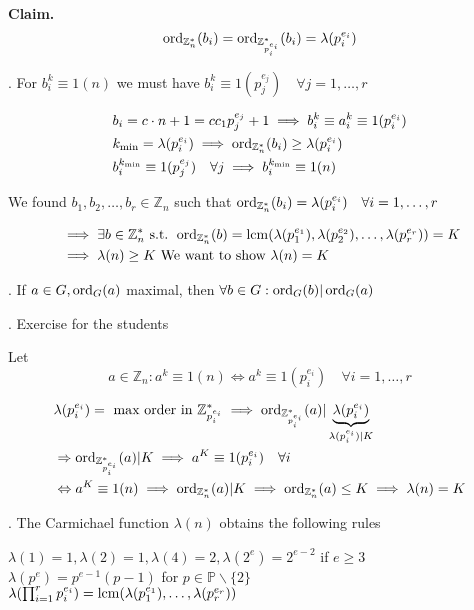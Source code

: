 \textbf{Claim.}
\[
  \operatorname{ord}_{\mathbb{Z}_n^{*}}(b_i) = \operatorname{ord}_{\mathbb{Z}_{p_i^{e_i}}^{*}} (b_i) = \lambda(p_i^{e_i})
\]

\Proof.
For $b_i^k \equiv 1 (n)$ we must have $b_i^k \equiv 1 (p_j^{e_j}) \quad \forall j = 1, \ldots, r$

\begin{align*}
  &b_i = c\cdot n+1 = c c_1 p_j^{e_j} +1 \implies b_i^k \equiv a_i^k \equiv 1 (p_i ^{e_i}) \\
  &k_{\min} = \lambda(p_i^{e_i}) \implies \operatorname{ord}_{\mathbb{Z}_n^{*}}(b_i) \geq \lambda(p_i^{e_i}) \\
  &b_i^{k_{\min}} \equiv 1 (p_j^{e_j}) \quad \forall j \implies b_i^{k_{\min}} \equiv 1 (n)
\end{align*}

We found $b_1, b_2, \ldots, b_r \in \mathbb{Z}_n$ such that $\operatorname{ord}_{\mathbb{Z}_n^{*}}(b_i) = \lambda(p_i^{e_i}) \quad \forall i = 1, \ldots, r$

\begin{align*}
  &\implies \exists b \in \mathbb{Z}_n^{*} \text{ s.t. } \operatorname{ord}_{\mathbb{Z}_n^{*}}(b) = \operatorname{lcm}(\lambda(p_1^{e_1}), \lambda(p_2^{e_2}), \ldots, \lambda(p_r^{e_r})) = K \\
  &\implies \lambda(n) \geq K \text{ We want to show $\lambda(n) = K$}
\end{align*}

\Theorem.
If $ a\in G, \operatorname{ord}_G(a)$ maximal, then $\forall b \in G: \operatorname{ord}_G(b) | \operatorname{ord}_G(a)$

\Proof. 
Exercise for the students

Let 
\[
  a\in \mathbb{Z}_n: a^k \equiv 1 (n) \Leftrightarrow a^k \equiv 1 (p_i^{e_i}) \quad \forall i = 1,\ldots, r
\]

\begin{align*}
  &\lambda(p_i^{e_i}) = \text{ max order in } \mathbb{Z}_{p_i^{e_i}}^{*} \implies \operatorname{ord}_{\mathbb{Z}_{p_i^{e_i}}^{*}}(a) | \underbrace{\lambda(p_i^{e_i})}_{\lambda(p_i^{e_i}) | K}\\
  &\Rightarrow \operatorname{ord}_{\mathbb{Z}_{p_i^{e_i}}^{*}}(a) | K \implies a^K \equiv 1 (p_i^{e_i}) \quad \forall i \\
  &\Leftrightarrow a^K \equiv 1 (n) \implies \operatorname{ord}_{\mathbb{Z}_{n}^{*}}(a) | K \implies  \operatorname{ord}_{\mathbb{Z}_n^{*}}(a) \leq K \implies \lambda(n) = K
\end{align*}

\Theorem.
The Carmichael function $\lambda(n)$ obtains the following rules

$\lambda(1) = 1, \lambda(2) = 1, \lambda(4) = 2, \lambda(2^e) = 2^{e-2} $ if $e \geq 3$\\
$\lambda(p^e) = p^{e-1}(p-1)$ for $p\in \mathbb{P} \backslash\{2\}$\\
$\lambda(\prod_{i=1}^{r} p_i^{e_i}) = \operatorname{lcm}(\lambda(p_1^{e_1}), \ldots, \lambda(p_r^{e_r}))$


